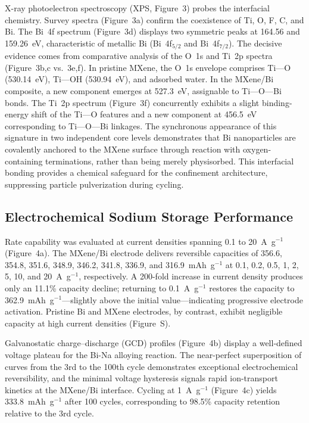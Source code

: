 X-ray photoelectron spectroscopy (XPS, Figure~3) probes the interfacial chemistry. Survey spectra (Figure~3a) confirm the coexistence of Ti, O, F, C, and Bi. The Bi~4f spectrum (Figure~3d) displays two symmetric peaks at 164.56 and 159.26~eV, characteristic of metallic Bi (Bi~4f$_{5/2}$ and Bi~4f$_{7/2}$). The decisive evidence comes from comparative analysis of the O~1s and Ti~2p spectra (Figure~3b,c vs.\ 3e,f). In pristine MXene, the O~1s envelope comprises Ti---O (530.14~eV), Ti---OH (530.94~eV), and adsorbed water. In the MXene/Bi composite, a new component emerges at 527.3~eV, assignable to Ti---O---Bi bonds. The Ti~2p spectrum (Figure~3f) concurrently exhibits a slight binding-energy shift of the Ti---O features and a new component at 456.5~eV corresponding to Ti---O---Bi linkages. The synchronous appearance of this signature in two independent core levels demonstrates that Bi nanoparticles are covalently anchored to the MXene surface through reaction with oxygen-containing terminations, rather than being merely physisorbed. This interfacial bonding provides a chemical safeguard for the confinement architecture, suppressing particle pulverization during cycling.

\subsection{Electrochemical Sodium Storage Performance}

Rate capability was evaluated at current densities spanning 0.1 to 20~A~g$^{-1}$ (Figure~4a). The MXene/Bi electrode delivers reversible capacities of 356.6, 354.8, 351.6, 348.9, 346.2, 341.8, 336.9, and 316.9~mAh~g$^{-1}$ at 0.1, 0.2, 0.5, 1, 2, 5, 10, and 20~A~g$^{-1}$, respectively. A 200-fold increase in current density produces only an 11.1\% capacity decline; returning to 0.1~A~g$^{-1}$ restores the capacity to 362.9~mAh~g$^{-1}$---slightly above the initial value---indicating progressive electrode activation. Pristine Bi and MXene electrodes, by contrast, exhibit negligible capacity at high current densities (Figure~S).

Galvanostatic charge--discharge (GCD) profiles (Figure~4b) display a well-defined voltage plateau for the Bi-Na alloying reaction. The near-perfect superposition of curves from the 3rd to the 100th cycle demonstrates exceptional electrochemical reversibility, and the minimal voltage hysteresis signals rapid ion-transport kinetics at the MXene/Bi interface. Cycling at 1~A~g$^{-1}$ (Figure~4c) yields 333.8~mAh~g$^{-1}$ after 100 cycles, corresponding to 98.5\% capacity retention relative to the 3rd cycle.

